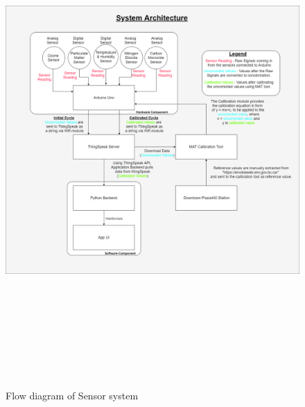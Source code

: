 \begin{figure}[h]
  \begin{center}
  \includegraphics[width=15.50cm,height=18.80cm]{images/figure68.png}
  \end{center}
  \caption{Flow diagram of Sensor system}
  \label{flow}
  \hspace{1 cm}
\end{figure}


\clearpage

